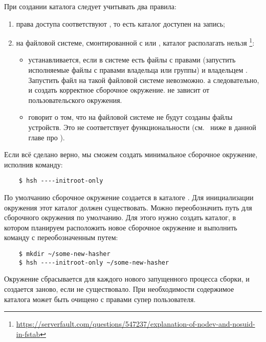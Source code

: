 \begin{itemize}
	При создании каталога  следует учитывать два правила:
	\begin{enumerate}
		\item права доступа соответствуют , то есть каталог доступен на запись;
		\item на файловой системе, смонтированной с  или , каталог располагать нельзя%
		\footnote{\href{https://serverfault.com/questions/547237/explanation-of-nodev-and-nosuid-in-fstab}{https://serverfault.com/questions/547237/explanation-of-nodev-and-nosuid-in-fstab}}:
		\begin{itemize}
			\item {} устанавливается, если в системе есть файлы с правами 
			(запустить исполняемые файлы с правами владельца или группы) и владельцем .
			Запустить файл  на такой файловой системе невозможно. а следовательно,
			и создать корректное сборочное окружение.  не зависит от пользовательского окружения.
			\item {} говорит о том, что на файловой системе не будут созданы файлы устройств.
				Это не соответствует функциональности  (см.~%
				ниже в данной главе про \hyperlink{mount_fs_hasher}{}).
		\end{itemize}
	\end{enumerate}
\end{itemize}
Если всё сделано верно, мы сможем создать минимальное сборочное окружение, исполнив команду:
\begin{verbatim}
	$ hsh ----initroot-only
\end{verbatim}
По умолчанию сборочное окружение создается в каталоге . Для инициализации окружения
этот каталог должен существовать. Можно переобозначить путь для сборочного окружения по умолчанию.
Для этого нужно создать каталог, в котором планируем расположить новое сборочное окружение и выполнить
команду с переобозначенным путем:
\begin{verbatim}
	$ mkdir ~/some-new-hasher
	$ hsh ----initroot-only ~/some-new-hasher
\end{verbatim}
Окружение сбрасывается для каждого нового запущенного процесса сборки, и создается заново, если
не существовало. При необходимости содержимое каталога может быть очищено с правами
супер пользователя.


